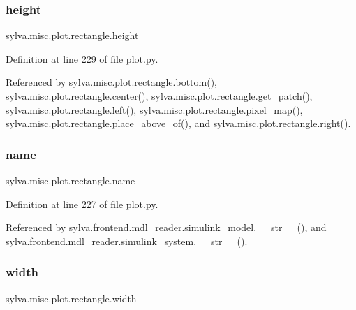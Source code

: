 \subsubsection{\texorpdfstring{height}{height}}
{\footnotesize\ttfamily sylva.\+misc.\+plot.\+rectangle.\+height}



Definition at line 229 of file plot.\+py.



Referenced by sylva.\+misc.\+plot.\+rectangle.\+bottom(), sylva.\+misc.\+plot.\+rectangle.\+center(), sylva.\+misc.\+plot.\+rectangle.\+get\+\_\+patch(), sylva.\+misc.\+plot.\+rectangle.\+left(), sylva.\+misc.\+plot.\+rectangle.\+pixel\+\_\+map(), sylva.\+misc.\+plot.\+rectangle.\+place\+\_\+above\+\_\+of(), and sylva.\+misc.\+plot.\+rectangle.\+right().

\mbox{\label{classsylva_1_1misc_1_1plot_1_1rectangle_aea9a12e78d03675a8af2682b9bbd656b}} 
\subsubsection{\texorpdfstring{name}{name}}
{\footnotesize\ttfamily sylva.\+misc.\+plot.\+rectangle.\+name}



Definition at line 227 of file plot.\+py.



Referenced by sylva.\+frontend.\+mdl\+\_\+reader.\+simulink\+\_\+model.\+\_\+\+\_\+str\+\_\+\+\_\+(), and sylva.\+frontend.\+mdl\+\_\+reader.\+simulink\+\_\+system.\+\_\+\+\_\+str\+\_\+\+\_\+().

\mbox{\label{classsylva_1_1misc_1_1plot_1_1rectangle_ad81773b097d59cb5c67b7e06ab6c022c}} 
\subsubsection{\texorpdfstring{width}{width}}
{\footnotesize\ttfamily sylva.\+misc.\+plot.\+rectangle.\+width}



